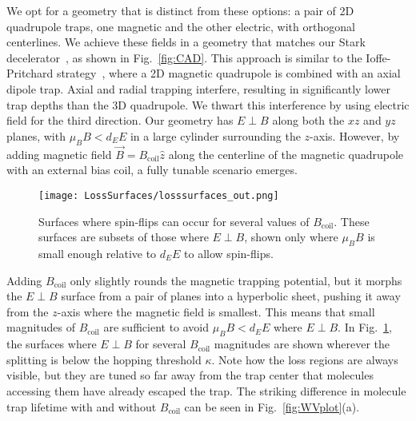 \documentclass[%
 reprint,
groupedaddress,
 amsmath,amssymb,
 aps,
prl,
]{revtex4-1}
\newcommand{\epb}{{$E\!\perp\!B$}}
\begin{document}
We opt for a geometry that is distinct from these options: a pair of 2D quadrupole traps, one magnetic and the other electric, with orthogonal centerlines. We achieve these fields in a geometry that matches our Stark decelerator~\cite{Bochinski2003}, as shown in Fig.~\ref{fig:CAD}. This approach is similar to the Ioffe-Pritchard strategy~\cite{pritchard1983}, where a 2D magnetic quadrupole is combined with an axial dipole trap. Axial and radial trapping interfere, resulting in significantly lower trap depths than the 3D quadrupole. We thwart this interference by using electric field for the third direction. Our geometry has \epb{} along both the $xz$ and $yz$ planes, with $\mu_BB < d_EE$ in a large cylinder surrounding the $z$-axis. However, by adding magnetic field $\vec{B}=B_\text{coil}\hat{z}$ along the centerline of the magnetic quadrupole with an external bias coil, a fully tunable scenario emerges. %


\begin{figure}[tb]
\texttt{[image: LossSurfaces/losssurfaces\_out.png]}%
\caption{
Surfaces where spin-flips can occur for several values of $B_\text{coil}$. These surfaces are subsets of those where \epb{}, shown only where $\mu_BB$ is small enough relative to $d_EE$ to allow spin-flips.
\label{fig:LSurfs}}
\end{figure}

Adding $B_\text{coil}$ only slightly rounds the magnetic trapping potential, but it morphs the \epb{} surface from a pair of planes into a hyperbolic sheet, pushing it away from the $z$-axis where the magnetic field is smallest. This means that small magnitudes of $B_\text{coil}$  are sufficient to avoid $\mu_BB< d_EE$ where \epb. In Fig.~\ref{fig:LSurfs}, the surfaces where \epb{} for several $B_\text{coil}$ magnitudes are shown wherever the splitting is below the hopping threshold $\kappa$. Note how the loss regions are always visible, but they are tuned so far away from the trap center that molecules accessing them have already escaped the trap. The striking difference in molecule trap lifetime with and without $B_\text{coil}$ can be seen in Fig.~\ref{fig:WVplot}(a).
\end{document}
